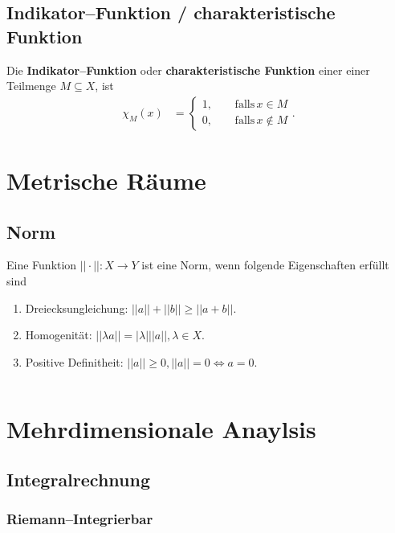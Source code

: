 \documentclass[a4paper,12pt]{article}
\numberwithin{equation}{section}
\begin{document}
\subsection{Indikator--Funktion / charakteristische Funktion}
Die \textbf{Indikator--Funktion} oder \textbf{charakteristische Funktion} einer einer Teilmenge $M\subseteq X$, ist
\begin{align} 
        \chi _M\left(x\right)&=\begin{cases}
                1,&\quad \,\text{falls}\,x \in M\\
                0,&\quad \,\text{falls}\,x \notin M
        \end{cases}\label{eq:charakteristische funktion}
.\end{align} 


\newpage
\section{Metrische Räume}
\subsection{Norm}
Eine Funktion $||\cdot ||:X\rightarrow Y$ ist eine Norm, wenn folgende Eigenschaften erfüllt sind
\begin{enumerate}[label=$\circ$]
        \item Dreiecksungleichung: $||a||+||b||\geq ||a+b||$.
        \item Homogenität: $||\lambda a||=|\lambda |||a||,\lambda  \in X$.
        \item Positive Definitheit: $||a||\geq 0,||a||=0\Leftrightarrow a=0$.
\end{enumerate}
$\label{eq:norm}$ 

\newpage
\section{Mehrdimensionale Anaylsis}
\subsection{Integralrechnung}
\subsubsection{Riemann--Integrierbar}
\end{document}
